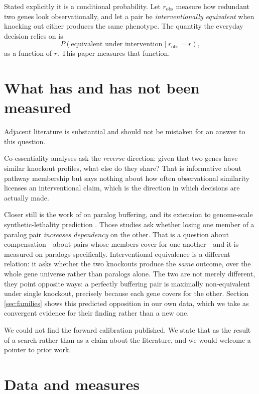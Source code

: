 \documentclass[11pt]{article}
\begin{document}
Stated explicitly it is a conditional probability. Let $r_{\mathrm{obs}}$
measure how redundant two genes look observationally, and let a pair be
\emph{interventionally equivalent} when knocking out either produces the
same phenotype. The quantity the everyday decision relies on is
\[
  P\!\left(\text{equivalent under intervention} \mid r_{\mathrm{obs}} = r\right),
\]
as a function of $r$. This paper measures that function.

\section{What has and has not been measured}

Adjacent literature is substantial and should not be mistaken for an answer
to this question.

Co-essentiality analyses ask the \emph{reverse} direction: given that two
genes have similar knockout profiles, what else do they share? That is
informative about pathway membership but says nothing about how often
observational similarity licenses an interventional claim, which is the
direction in which decisions are actually made.

Closer still is the work of \citet{dekegel2019} on paralog buffering, and
its extension to genome-scale synthetic-lethality prediction
\citep{dekegel2021,dekegel2026}. Those studies ask whether losing one
member of a paralog pair \emph{increases dependency} on the other. That is
a question about compensation---about pairs whose members cover for one
another---and it is measured on paralogs specifically. Interventional
equivalence is a different relation: it asks whether the two knockouts
produce the \emph{same} outcome, over the whole gene universe rather than
paralogs alone. The two are not merely different, they point opposite ways:
a perfectly buffering pair is maximally non-equivalent under single
knockout, precisely because each gene covers for the other. Section
\ref{sec:families} shows this predicted opposition in our own data, which we
take as convergent evidence for their finding rather than a new one.

We could not find the forward calibration published. We state that as the
result of a search rather than as a claim about the literature, and we would
welcome a pointer to prior work.

\section{Data and measures}
\end{document}
